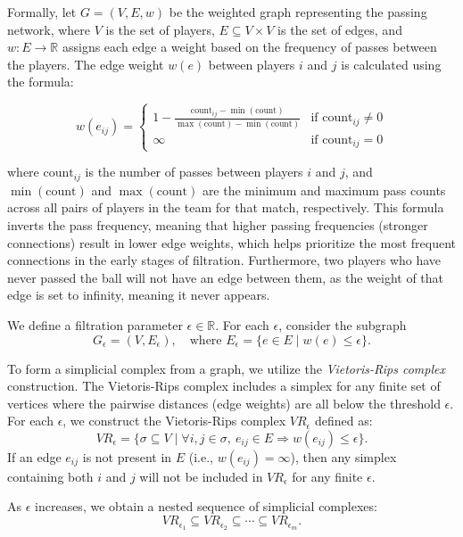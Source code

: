 \documentclass[10pt,twocolumn]{article}
\begin{document}
Formally, let $ G = (V, E, w) $ be the weighted graph representing the passing network, where $ V $ is the set of players, $ E \subseteq V \times V $ is the set of edges, and $ w: E \to \mathbb{R} $ assigns each edge a weight based on the frequency of passes between the players. The edge weight $ w(e) $ between players $ i $ and $ j $ is calculated using the formula:

\[
w(e_{ij}) = 
\begin{cases} 
1 - \frac{\text{count}_{ij} - \min(\text{count})}{\max(\text{count}) - \min(\text{count})} & \text{if } \text{count}_{ij} \neq 0 \\
\infty & \text{if } \text{count}_{ij} = 0
\end{cases}
\]

where $ \text{count}_{ij} $ is the number of passes between players $ i $ and $ j $, and $ \min(\text{count}) $ and $ \max(\text{count}) $ are the minimum and maximum pass counts across all pairs of players in the team for that match, respectively. This formula inverts the pass frequency, meaning that higher passing frequencies (stronger connections) result in lower edge weights, which helps prioritize the most frequent connections in the early stages of filtration. Furthermore, two players who have never passed the ball will not have an edge between them, as the weight of that edge is set to infinity, meaning it never appears.

We define a filtration parameter $\epsilon \in \mathbb{R}$. For each $\epsilon$, consider the subgraph  
\[
G_\epsilon = (V, E_\epsilon), \quad \text{where } E_\epsilon = \{ e \in E \mid w(e) \leq \epsilon \}.
\]

To form a simplicial complex from a graph, we utilize the \textit{Vietoris-Rips complex} construction. The Vietoris-Rips complex includes a simplex for any finite set of vertices where the pairwise distances (edge weights) are all below the threshold $\epsilon$. For each $\epsilon$, we construct the Vietoris-Rips complex $ VR_\epsilon $ defined as:
\[
VR_\epsilon = \{ \sigma \subseteq V \mid \forall i, j \in \sigma, \ e_{ij} \in E \Rightarrow w(e_{ij}) \leq \epsilon \}.
\]
If an edge $ e_{ij} $ is not present in $ E $ (i.e., $ w(e_{ij}) = \infty $), then any simplex containing both $ i $ and $ j $ will not be included in $ VR_\epsilon $ for any finite $\epsilon$.

As $\epsilon$ increases, we obtain a nested sequence of simplicial complexes:
\[
VR_{\epsilon_1} \subseteq VR_{\epsilon_2} \subseteq \cdots \subseteq VR_{\epsilon_m}.
\]
\end{document}
